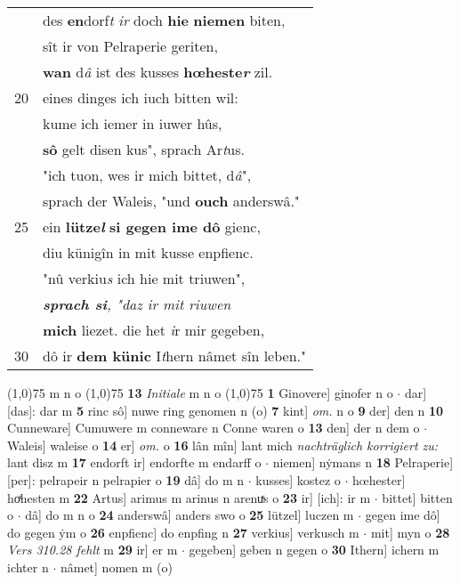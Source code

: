 \documentclass[8pt,a4paper,notitlepage]{article}
\begin{document}
\begin{table}[ht]
\begin{minipage}[t]{0.5\linewidth}
\begin{tabular}{rl}
 & des \textbf{en}dorf\textit{t} \textit{ir} doch \textbf{hie} \textbf{niemen} biten,\\ 
 & sît ir von Pelraperie geriten,\\ 
 & \textbf{wan} d\textit{â} ist des kusses \textbf{hœheste\textit{r}} zil.\\ 
20 & eines dinges ich iuch bitten wil:\\ 
 & kume ich iemer in iuwer hûs,\\ 
 & \textbf{sô} gelt disen kus", sprach Ar\textit{t}us.\\ 
 & "ich tuon, wes ir mich bittet, d\textit{â}",\\ 
 & sprach der Waleis, "und \textbf{ouch} anderswâ."\\ 
25 & ein \textbf{lütze\textit{l}} \textbf{si gegen ime dô} gienc,\\ 
 & diu künigîn in mit kusse enpfienc.\\ 
 & "nû verkiu\textit{s} ich hie mit triuwen",\\ 
 & \textit{\textbf{sprach si}}\textit{, "daz ir mit riuwen}\\ 
 & \textbf{mich} liezet. die het \textit{i}r mir gegeben,\\ 
30 & dô ir \textbf{dem künic} I\textit{t}hern nâmet sîn leben."\\ 
\end{tabular}
\scriptsize
\line(1,0){75} \newline
m n o \newline
\line(1,0){75} \newline
\textbf{13} \textit{Initiale} m n o  \newline
\line(1,0){75} \newline
\textbf{1} Ginovere] ginofer n o  $\cdot$ dar] [das]: dar m \textbf{5} rinc sô] nuwe ring genomen n (o) \textbf{7} kint] \textit{om.} n o \textbf{9} der] den n \textbf{10} Cunneware] Cumuwere m conneware n Conne waren o \textbf{13} den] der n dem o  $\cdot$ Waleis] waleise o \textbf{14} er] \textit{om.} o \textbf{16} lân mîn] lant mich \textit{nachträglich korrigiert zu:} lant disz m \textbf{17} endorft ir] endorfte m endarff o  $\cdot$ niemen] nẏmans n \textbf{18} Pelraperie] [per]: pelrapeir n pelrapier o \textbf{19} dâ] do m n  $\cdot$ kusses] kostez o  $\cdot$ hœhester] hoͯhesten m \textbf{22} Artus] arimus m arinus n arenuͯs o \textbf{23} ir] [ich]: ir m  $\cdot$ bittet] bitten o  $\cdot$ dâ] do m n o \textbf{24} anderswâ] anders swo o \textbf{25} lützel] luczen m  $\cdot$ gegen ime dô] do gegen ẏm o \textbf{26} enpfienc] do enpfing n \textbf{27} verkius] verkusch m  $\cdot$ mit] myn o \textbf{28} \textit{Vers 310.28 fehlt} m  \textbf{29} ir] er m  $\cdot$ gegeben] geben n gegen o \textbf{30} Ithern] ichern m ichter n  $\cdot$ nâmet] nomen m (o) \newline
\end{minipage}
\end{table}
\end{document}
